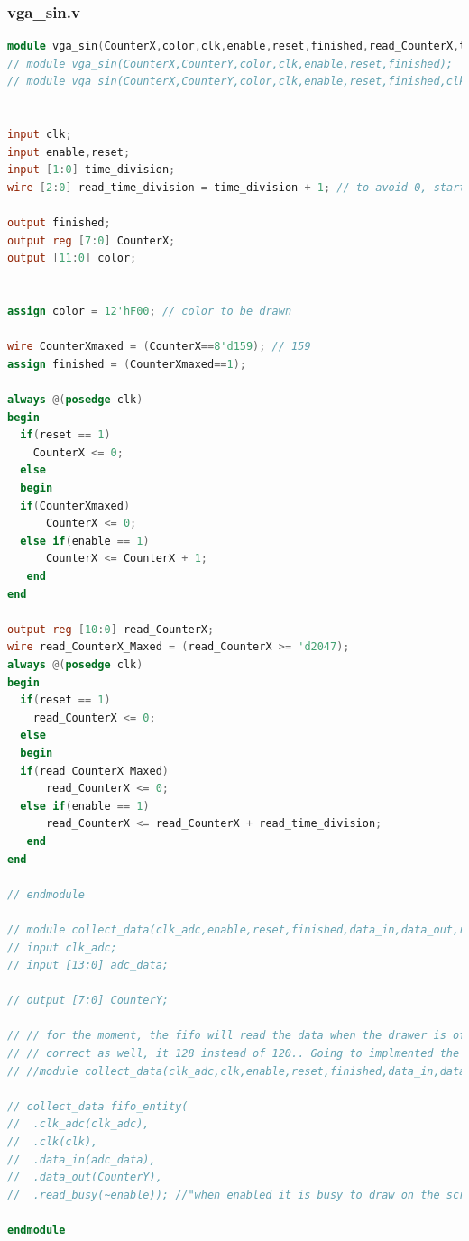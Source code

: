\documentclass[11pt]{scrartcl}
\begin{document}
\subsubsection{vga\_sin.v}
\label{sec:vgasinv}
\begin{lstlisting}[language=Verilog]
module vga_sin(CounterX,color,clk,enable,reset,finished,read_CounterX,time_division);
// module vga_sin(CounterX,CounterY,color,clk,enable,reset,finished);
// module vga_sin(CounterX,CounterY,color,clk,enable,reset,finished,clk_adc,adc_data);


input clk;
input enable,reset;
input [1:0] time_division;
wire [2:0] read_time_division = time_division + 1; // to avoid 0, start from 1

output finished;
output reg [7:0] CounterX;
output [11:0] color;

 
assign color = 12'hF00; // color to be drawn

wire CounterXmaxed = (CounterX==8'd159); // 159
assign finished = (CounterXmaxed==1);

always @(posedge clk)
begin
  if(reset == 1)
    CounterX <= 0;
  else
  begin
  if(CounterXmaxed)
      CounterX <= 0;
  else if(enable == 1)
      CounterX <= CounterX + 1;
   end
end

output reg [10:0] read_CounterX;
wire read_CounterX_Maxed = (read_CounterX >= 'd2047);
always @(posedge clk)
begin
  if(reset == 1)
    read_CounterX <= 0;
  else
  begin
  if(read_CounterX_Maxed)
      read_CounterX <= 0;
  else if(enable == 1)
      read_CounterX <= read_CounterX + read_time_division;
   end
end

// endmodule

// module collect_data(clk_adc,enable,reset,finished,data_in,data_out,read_busy);
// input clk_adc;
// input [13:0] adc_data;

// output [7:0] CounterY;

// // for the moment, the fifo will read the data when the drawer is off continously until full. The word length is not
// // correct as well, it 128 instead of 120.. Going to implmented the trigger after testing the adc
// //module collect_data(clk_adc,clk,enable,reset,finished,data_in,data_out,read_busy);

// collect_data fifo_entity(
//  .clk_adc(clk_adc),
//  .clk(clk),
//  .data_in(adc_data),
//  .data_out(CounterY), 
//  .read_busy(~enable)); //"when enabled it is busy to draw on the screen, usually, enable is the opposite of reset and finifhsed
  
endmodule

\end{lstlisting}
\end{document}
